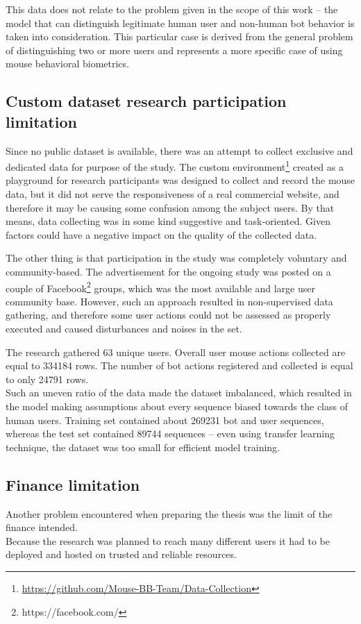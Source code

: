 This data does not relate to the problem given in the scope of this work – the model that can distinguish legitimate human user and non-human bot behavior is taken into consideration.
This particular case is derived from the general problem of distinguishing two or more users and represents a more specific case of using mouse behavioral biometrics.

\subsection{Custom dataset research participation limitation}\label{subsec:custom-dataset-research}
Since no public dataset is available, there was an attempt to collect exclusive and dedicated data for purpose of the study.
The custom environment\footnote{\url{https://github.com/Mouse-BB-Team/Data-Collection}} created as a playground for research participants was designed to collect and record the mouse data, but it did not serve the responsiveness of a real commercial website, and therefore it may be causing some confusion among the subject users.
By that means, data collecting was in some kind suggestive and task-oriented.
Given factors could have a negative impact on the quality of the collected data.

The other thing is that participation in the study was completely voluntary and community-based.
The advertisement for the ongoing study was posted on a couple of Facebook\footnote{https://facebook.com/} groups, which was the most available and large user community base.
However, such an approach resulted in non-supervised data gathering, and therefore some user actions could not be assessed as properly executed and caused disturbances and noises in the set.

The research gathered \num{63} unique users.
Overall user mouse actions collected are equal to \num{334184} rows.
The number of bot actions registered and collected is equal to only \num{24791} rows.\\
Such an uneven ratio of the data made the dataset imbalanced, which resulted in the model making assumptions about every sequence biased towards the class of human users.
Training set contained about \num{269231} bot and user sequences, whereas the test set contained \num{89744} sequences – even using transfer learning technique, the dataset was too small for efficient model training.

\subsection{Finance limitation}\label{subsec:finance-limitation}
Another problem encountered when preparing the thesis was the limit of the finance intended.\\
Because the research was planned to reach many different users it had to be deployed and hosted on trusted and reliable resources.

